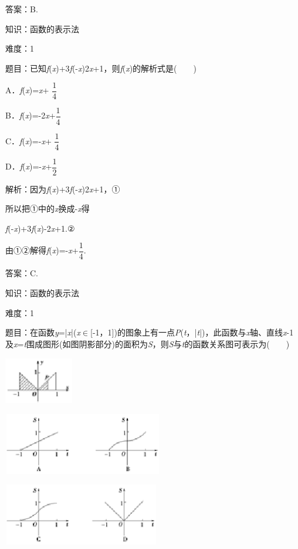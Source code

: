 \documentclass{article} %
\begin{document}
答案：B.

知识：函数的表示法

难度：1

题目：已知\textit{f}(\textit{x})+3\textit{f}(-\textit{x})2\textit{x}+1，则\textit{f}(\textit{x})的解析式是(　　)

A．\textit{f}(\textit{x})=\textit{x}+ $\dfrac{1}{4}$  

B．\textit{f}(\textit{x})=-2\textit{x}+$\dfrac{1}{4}$

C．\textit{f}(\textit{x})=-\textit{x}+ $\dfrac{1}{4}$

D．\textit{f}(\textit{x})=-\textit{x}+$\dfrac{1}{2}$

解析：因为\textit{f}(\textit{x})+3\textit{f}(-\textit{x})2\textit{x}+1，①

所以把①中的\textit{x}换成-\textit{x}得

\textit{f}(-\textit{x})+3\textit{f}(\textit{x})-2\textit{x}+1.②

由①②解得\textit{f}(\textit{x})=-\textit{x}+$\dfrac{1}{4}$.

答案：C.

知识：函数的表示法

难度：1

题目：在函数\textit{y}=|\textit{x}|(\textit{x}$\mathrm{\in}$[-1，1])的图象上有一点\textit{P}(\textit{t}，|\textit{t}|)，此函数与\textit{x}轴、直线\textit{x}-1及\textit{x}=\textit{t}围成图形(如图阴影部分)的面积为\textit{S}，则\textit{S}与\textit{t}的函数关系图可表示为(　　)

\includegraphics*[width=1.19in, height=0.80in, keepaspectratio=false]{image23}

\includegraphics*[width=2.75in, height=1.06in, keepaspectratio=false]{image24}

\includegraphics*[width=2.70in, height=1.06in, keepaspectratio=false]{image25}
\end{document}
